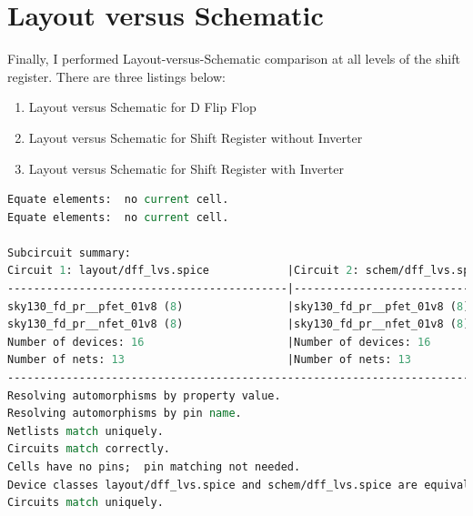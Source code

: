 \documentclass[11pt]{article}
\begin{document}
    \section{Layout versus Schematic}
    Finally, I performed Layout-versus-Schematic comparison at all levels of the shift register. There are three listings below:
    \begin{enumerate}
        \item Layout versus Schematic for D Flip Flop
        \item Layout versus Schematic for Shift Register without Inverter
        \item Layout versus Schematic for Shift Register with Inverter
    \end{enumerate}
    \begin{lstlisting}[language=tcl, caption=\textbf{Layout versus Schematic for D Flip Flop}]
Equate elements:  no current cell.
Equate elements:  no current cell.

Subcircuit summary:
Circuit 1: layout/dff_lvs.spice            |Circuit 2: schem/dff_lvs.spice             
-------------------------------------------|-------------------------------------------
sky130_fd_pr__pfet_01v8 (8)                |sky130_fd_pr__pfet_01v8 (8)                
sky130_fd_pr__nfet_01v8 (8)                |sky130_fd_pr__nfet_01v8 (8)                
Number of devices: 16                      |Number of devices: 16                      
Number of nets: 13                         |Number of nets: 13                         
---------------------------------------------------------------------------------------
Resolving automorphisms by property value.
Resolving automorphisms by pin name.
Netlists match uniquely.
Circuits match correctly.
Cells have no pins;  pin matching not needed.
Device classes layout/dff_lvs.spice and schem/dff_lvs.spice are equivalent.
Circuits match uniquely.
    \end{lstlisting}
\end{document}
